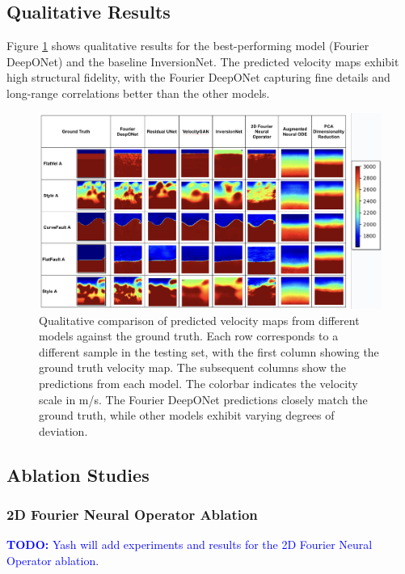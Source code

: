\documentclass{article}
\begin{document}
\subsection{Qualitative Results}

Figure \ref{fig:qualitative_results} shows qualitative results for the best-performing model (Fourier DeepONet) and the baseline InversionNet. The predicted velocity maps exhibit high structural fidelity, with the Fourier DeepONet capturing fine details and long-range correlations better than the other models.

\begin{figure}
    \centering
    \includegraphics[width=\linewidth]{figures/qualitative_results.png}
    \caption{Qualitative comparison of predicted velocity maps from different models against the ground truth. Each row corresponds to a different sample in the testing set, with the first column showing the ground truth velocity map. The subsequent columns show the predictions from each model. The colorbar indicates the velocity scale in m/s. The Fourier DeepONet predictions closely match the ground truth, while other models exhibit varying degrees of deviation.}
    \label{fig:qualitative_results}
\end{figure}

\subsection{Ablation Studies}

\subsubsection{2D Fourier Neural Operator Ablation}
\textcolor{blue}{\textbf{TODO:} Yash will add experiments and results for the 2D Fourier Neural Operator ablation.}
\end{document}
